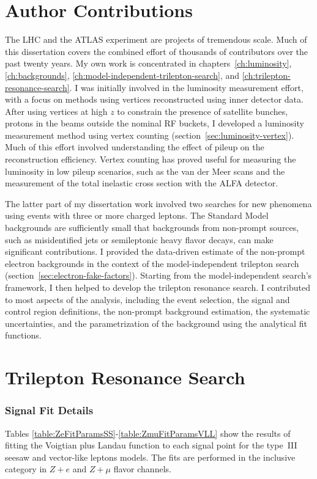 \begin{appendices}

\chapter{Author Contributions}
The LHC and the ATLAS experiment are projects of tremendous scale. Much of this dissertation covers the combined effort of thousands of contributors over the past twenty years. My own work is concentrated in chapters~\ref{ch:luminosity}, \ref{ch:backgrounds}, \ref{ch:model-independent-trilepton-search}, and \ref{ch:trilepton-resonance-search}. I was initially involved in the luminosity measurement effort, with a focus on methods using vertices reconstructed using inner detector data. After using vertices at high $z$ to constrain the presence of satellite bunches, protons in the beams outside the nominal RF buckets, I developed a luminosity measurement method using vertex counting (section~\ref{sec:luminosity-vertex}). Much of this effort involved understanding the effect of pileup on the reconstruction efficiency. Vertex counting has proved useful for measuring the luminosity in low pileup scenarios, such as the van der Meer scans and the measurement of the total inelastic cross section with the ALFA detector. 

The latter part of my dissertation work involved two searches for new phenomena using events with three or more charged leptons. The Standard Model backgrounds are sufficiently small that backgrounds from non-prompt sources, such as misidentified jets or semileptonic heavy flavor decays, can make significant contributions. I provided the data-driven estimate of the non-prompt electron backgrounds in the context of the model-independent trilepton search (section~\ref{sec:electron-fake-factors}). Starting from the model-independent search's framework, I then helped to develop the trilepton resonance search. I contributed to most aspects of the analysis, including the event selection, the signal and control region definitions, the non-prompt background estimation, the systematic uncertainties, and the parametrization of the background using the analytical fit functions.

\chapter{Trilepton Resonance Search}\label{sec:appendix-resonance}

\subsection{Signal Fit Details}\label{sec:appendix-resonance-signal-fits}
Tables \ref{table:ZeFitParamsSS}-\ref{table:ZmuFitParamsVLL} show the results of fitting the Voigtian plus Landau function to each signal point for the type~III seesaw and vector-like leptons models. The fits are performed in the inclusive category in $Z+e$ and $Z+\mu$ flavor channels.  



\end{appendices}
